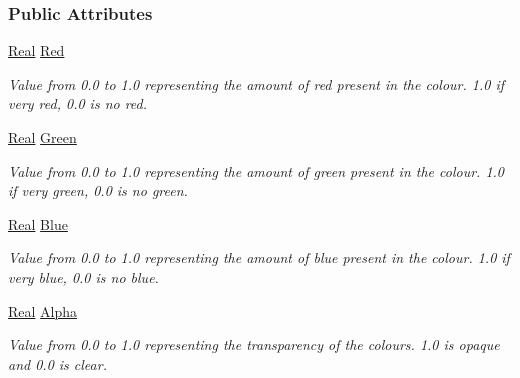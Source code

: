 \subsubsection*{Public Attributes}
\begin{DoxyCompactItemize}
\item 
\hypertarget{classphys_1_1ColourValue_a32b5411b9b87f92a6626f3f4d5f0a158}{
\hyperlink{namespacephys_af7eb897198d265b8e868f45240230d5f}{Real} \hyperlink{classphys_1_1ColourValue_a32b5411b9b87f92a6626f3f4d5f0a158}{Red}}
\label{d3/db0/classphys_1_1ColourValue_a32b5411b9b87f92a6626f3f4d5f0a158}

\begin{DoxyCompactList}\small\item\em Value from 0.0 to 1.0 representing the amount of red present in the colour. 1.0 if very red, 0.0 is no red. \item\end{DoxyCompactList}\item 
\hypertarget{classphys_1_1ColourValue_adea93a8cd64acc8b5fd1851b4460af00}{
\hyperlink{namespacephys_af7eb897198d265b8e868f45240230d5f}{Real} \hyperlink{classphys_1_1ColourValue_adea93a8cd64acc8b5fd1851b4460af00}{Green}}
\label{d3/db0/classphys_1_1ColourValue_adea93a8cd64acc8b5fd1851b4460af00}

\begin{DoxyCompactList}\small\item\em Value from 0.0 to 1.0 representing the amount of green present in the colour. 1.0 if very green, 0.0 is no green. \item\end{DoxyCompactList}\item 
\hypertarget{classphys_1_1ColourValue_a403503f979575b17d1873f031e8d7d75}{
\hyperlink{namespacephys_af7eb897198d265b8e868f45240230d5f}{Real} \hyperlink{classphys_1_1ColourValue_a403503f979575b17d1873f031e8d7d75}{Blue}}
\label{d3/db0/classphys_1_1ColourValue_a403503f979575b17d1873f031e8d7d75}

\begin{DoxyCompactList}\small\item\em Value from 0.0 to 1.0 representing the amount of blue present in the colour. 1.0 if very blue, 0.0 is no blue. \item\end{DoxyCompactList}\item 
\hypertarget{classphys_1_1ColourValue_a5fc5eceef739a91d7cc079767d712f52}{
\hyperlink{namespacephys_af7eb897198d265b8e868f45240230d5f}{Real} \hyperlink{classphys_1_1ColourValue_a5fc5eceef739a91d7cc079767d712f52}{Alpha}}
\label{d3/db0/classphys_1_1ColourValue_a5fc5eceef739a91d7cc079767d712f52}

\begin{DoxyCompactList}\small\item\em Value from 0.0 to 1.0 representing the transparency of the colours. 1.0 is opaque and 0.0 is clear. \item\end{DoxyCompactList}\end{DoxyCompactItemize}


